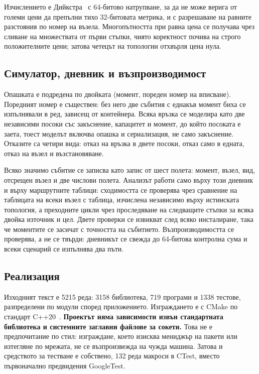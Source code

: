 Изчислението е Дийкстра~\cite{dijkstra1959} с 64-битово натрупване, за да не може верига от
големи цени да препълни тихо 32-битовата метрика, и с разрешаване на равните разстояния по
номер на възела. Многопътността при равна цена се получава чрез сливане на множествата от първи
стъпки, чиято коректност почива на строго положителните цени; затова четецът на топологии
отхвърля цена нула.

\subsection{Симулатор, дневник и възпроизводимост}

Опашката е подредена по двойката (момент, пореден номер на вписване). Поредният номер е
съществен: без него две събития с еднакъв момент биха се изпълнявали в ред, зависещ от
контейнера. Всяка връзка се моделира като две независими посоки със закъснение, капацитет и
момент, до който посоката е заета, тоест моделът включва опашка и сериализация, не само
закъснение. Отказите са четири вида: отказ на връзка в двете посоки, отказ само в едната, отказ
на възел и възстановяване.

Всяко значимо събитие се записва като запис от шест полета: момент, възел, вид, отсрещен възел
и две числови полета. Анализът работи само върху този дневник и върху маршрутните таблици:
сходимостта се проверява чрез сравнение на таблицата на всеки възел с таблица, изчислена
независимо върху истинската топология, а преходните цикли чрез проследяване на следващите
стъпки за всяка двойка източник и цел. Двете проверки се извикват след всяко инсталиране, така
че моментите се засичат с точността на събитието. Възпроизводимостта се проверява, а не се
твърди: дневникът се свежда до 64-битова контролна сума и всеки сценарий се изпълнява два пъти.

\subsection{Реализация}

Изходният текст е 5215 реда: 3158 библиотека, 719 програми и 1338 тестове, разпределени по
модули според приложението. Изграждането е с CMake по стандарт C++20~\cite{iso_cpp20}.
\textbf{Проектът няма зависимости извън стандартната библиотека и системните заглавни файлове
за сокети.} Това не е предпочитание по стил: изграждане, което изисква мениджър на пакети или
изтегляне по мрежата, не се възпроизвежда на чужда машина. Затова и средството за тестване е
собствено, 132 реда макроси в CTest, вместо първоначално предвидения GoogleTest.

